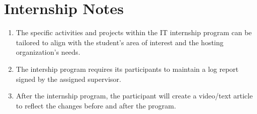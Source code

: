 


\section{Internship Notes}
\begin{enumerate}
    \item The specific activities and projects within the IT internship program can be tailored to align with the student's area of interest and the hosting organization's needs.
    \item The intership program requires its participants to maintain a log report signed by the assigned supervisor.
    \item After the internship program, the participant will create a video/text article to reflect the changes before and after the program.
\end{enumerate}